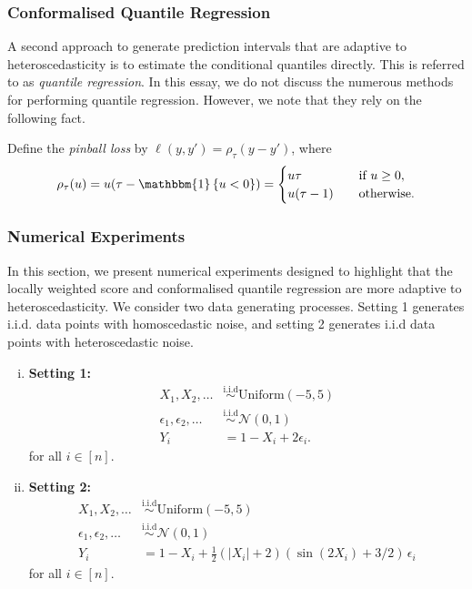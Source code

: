 \documentclass[11pt, titlepage]{article} %
\newcommand{\R}{\mathrm}
\newcommand{\Ind}[1]{\mathbbm{1}\left\{ #1 \right\}}
\numberwithin{equation}{section}
\theoremstyle{definition}
\numberwithin{theorem}{section}
\numberwithin{lemma}{section}
\numberwithin{corollary}{section}
\numberwithin{proposition}{section}
\numberwithin{definition}{section}
\numberwithin{remark}{section}
\begin{document}
\subsubsection{Conformalised Quantile Regression}

A second approach to generate prediction intervals that are adaptive to heteroscedasticity is to estimate the conditional quantiles directly. This is referred to as \textit{quantile regression}. In this essay, we do not discuss the numerous methods for performing quantile regression. However, we note that they rely on the following fact. \vskip5pt

\noindent
Define the \textit{pinball loss} by \(\ell(y, y') = \rho_\tau(y - y')\), where \[\rho_\tau(u) = u(\tau - \Ind{u < 0} ) = \begin{cases}
    u\tau &\quad \text{if } u \geq 0, \\
    u(\tau - 1) &\quad \text{otherwise.}
\end{cases}\]

\subsubsection{Numerical Experiments}

In this section, we present numerical experiments designed to highlight that the locally weighted score and conformalised quantile regression are more adaptive to heteroscedasticity. We consider two data generating processes. Setting 1 generates i.i.d. data points with homoscedastic noise, and setting 2 generates i.i.d data points with heteroscedastic noise.
\begin{enumerate}[(i)]
    \item \textbf{Setting 1: } \begin{align*}
        X_1, X_2, \ldots &\overset{\R{i.i.d}}{\sim} \R{Uniform}(-5,5) \\
        \epsilon_1, \epsilon_2, \ldots &\overset{\R{i.i.d}}{\sim} \mathcal{N}(0,1) \\
        Y_i &= 1 - X_i + 2\epsilon_i. 
    \end{align*} for all \(i \in [n]\).
    \item \textbf{Setting 2: } \begin{align*}
        X_1, X_2, \ldots &\overset{\R{i.i.d}}{\sim} \R{Uniform}(-5,5) \\
        \epsilon_1, \epsilon_2, \ldots &\overset{\R{i.i.d}}{\sim} \mathcal{N}(0,1) \\
        Y_i &= 1 - X_i + \frac{1}{2}(|X_i| + 2)(\sin(2X_i) + 3/2) \, \epsilon_i
    \end{align*} for all \(i \in [n]\).    
\end{enumerate}
\end{document}
